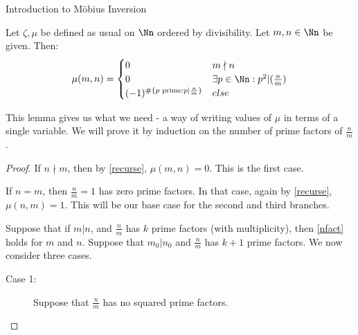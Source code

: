 \documentclass[12pt]{pom_thesis}
\begin{document}
\begin{chapter}{Introduction to M\"obius Inversion}
\begin{lemma}\label{nfact}
Let $\zeta, \mu$ be defined as usual on $\Nn$ ordered by divisibility. Let $m,n \in \Nn$ be given.  Then:
\[
\mu(m,n) =
\begin{cases}
0 & m\nmid n\\
0 & \exists p \in \Nn: p^2|(\frac nm )\\
(-1)^{\#\{p \text{ prime}: p|\frac nm\}} & else
\end{cases}
\]
\end{lemma}
This lemma gives us what we need - a way of writing values of $\mu$ in terms of a single variable. We will prove it by induction on the number of prime factors of $\frac nm$.
\begin{proof}
If $n \nmid m$, then by \ref{recurse}, $\mu(m,n) = 0$. This is the first case.

If $n = m$, then $\frac nm=1$ has zero prime factors. In that case, again by \ref{recurse}, $\mu(n,m) = 1$. This will be our base case for the second and third branches.

Suppose that if $m|n$, and $\frac nm$ has $k$ prime factors (with multiplicity), then \ref{nfact} holds for $m$ and $n$. Suppose that $m_0|n_0$ and $\frac nm$ has $k+1$ prime factors. We now consider three cases.
\begin{description}
\item[Case 1:] Suppose that $\frac nm$ has no squared prime factors. 
\end{description}
\end{proof}

\end{chapter}
\end{document}
